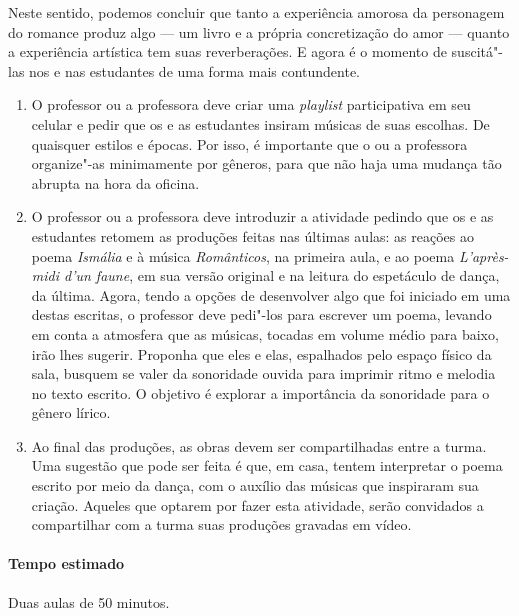 \documentclass[12pt]{extarticle}
\begin{document}
Neste sentido, podemos concluir que tanto a experiência amorosa da personagem
do romance produz algo --- um livro e a própria concretização do amor ---
quanto a experiência artística tem suas reverberações. E agora é o momento de 
suscitá"-las nos e nas estudantes de uma forma mais contundente.


\begin{enumerate}
\paragraph{Metodologia}

  \item
  O professor ou a professora deve criar uma \textit{playlist} participativa em seu celular
  e pedir que os e as estudantes insiram músicas de suas escolhas. De quaisquer
  estilos e épocas. Por isso, é importante que o ou a professora 
  organize"-as minimamente por gêneros, para que não haja uma mudança tão abrupta
  na hora da oficina. 


  \item
  O professor ou a professora deve introduzir a atividade pedindo que os e as estudantes
  retomem as produções feitas nas últimas aulas: as reações ao poema \textit{Ismália}
  e à música \textit{Românticos}, na primeira aula, e ao poema \textit{L'après-midi d'un faune},
  em sua versão original e na leitura do espetáculo de dança, da última. Agora,
  tendo a opções de desenvolver algo que foi iniciado em uma destas escritas,
  o professor deve pedi"-los para escrever um poema, levando em conta a
  atmosfera que as músicas, tocadas em volume médio para baixo, irão lhes sugerir. 
  Proponha que eles e elas, espalhados pelo espaço físico da sala, 
  busquem se valer da sonoridade ouvida para imprimir ritmo e
  melodia no texto escrito. O objetivo é explorar a importância da sonoridade
  para o gênero lírico.

  \item
  Ao final das produções, as obras devem ser compartilhadas entre a turma. 
  Uma sugestão que pode ser feita é que, em casa, tentem interpretar o poema
  escrito por meio da dança, com o auxílio das músicas que inspiraram sua criação.
  Aqueles que optarem por fazer esta atividade, serão convidados a compartilhar 
  com a turma suas produções gravadas em vídeo.


\end{enumerate}

\paragraph{Tempo estimado} Duas aulas de 50 minutos.
\end{document}
